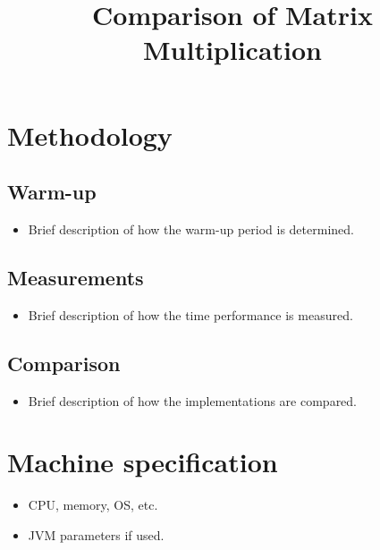 \documentclass[onecolumn, conference]{IEEEtran}
\newcommand{\conciseItem}{\itemsep1pt \parskip0pt \parsep0pt}
\begin{document}
%
\title{Comparison of Matrix Multiplication}


\author{
}

\maketitle
\section{Methodology}
\subsection{Warm-up}
\begin{itemize}
	\conciseItem
	\item Brief description of how the warm-up period is determined.
\end{itemize}
\subsection{Measurements}
\begin{itemize}
	\conciseItem
	\item Brief description of how the time performance is measured.
\end{itemize}
\subsection{Comparison}
\begin{itemize}
	\conciseItem
	\item Brief description of how the implementations are compared.
\end{itemize}
\section{Machine specification}
\begin{itemize}
	\conciseItem
	\item CPU, memory, OS, etc.
	\item JVM parameters if used.
\end{itemize}
\end{document}
